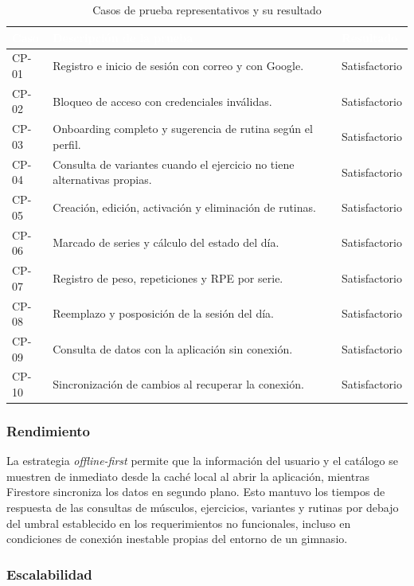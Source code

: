\documentclass[12pt,letterpaper]{article}
\newcommand{\gymtableheaderrow}{\rowcolor{gymblue}}
\newcommand{\gymth}[1]{\textcolor{white}{\textbf{#1}}}
\begin{document}
\begin{table}[H]
\centering
{}
\begin{tabularx}{0.98\textwidth}{L{0.9cm} Y L{2.1cm}}
\toprule
\gymtableheaderrow
\gymth{Caso} & \gymth{Descripción de la prueba} & \gymth{Resultado} \\
\midrule
CP-01 & Registro e inicio de sesión con correo y con Google. & Satisfactorio \\
CP-02 & Bloqueo de acceso con credenciales inválidas. & Satisfactorio \\
CP-03 & Onboarding completo y sugerencia de rutina según el perfil. & Satisfactorio \\
CP-04 & Consulta de variantes cuando el ejercicio no tiene alternativas propias. & Satisfactorio \\
CP-05 & Creación, edición, activación y eliminación de rutinas. & Satisfactorio \\
CP-06 & Marcado de series y cálculo del estado del día. & Satisfactorio \\
CP-07 & Registro de peso, repeticiones y RPE por serie. & Satisfactorio \\
CP-08 & Reemplazo y posposición de la sesión del día. & Satisfactorio \\
CP-09 & Consulta de datos con la aplicación sin conexión. & Satisfactorio \\
CP-10 & Sincronización de cambios al recuperar la conexión. & Satisfactorio \\
\bottomrule
\end{tabularx}
\caption{Casos de prueba representativos y su resultado}
\label{tab:casos-prueba}
\end{table}

\subsubsection{Rendimiento}

La estrategia \textit{offline-first} permite que la información del usuario y el catálogo se muestren de inmediato desde la caché local al abrir la aplicación, mientras Firestore sincroniza los datos en segundo plano. Esto mantuvo los tiempos de respuesta de las consultas de músculos, ejercicios, variantes y rutinas por debajo del umbral establecido en los requerimientos no funcionales, incluso en condiciones de conexión inestable propias del entorno de un gimnasio.

\subsubsection{Escalabilidad}
\end{document}
